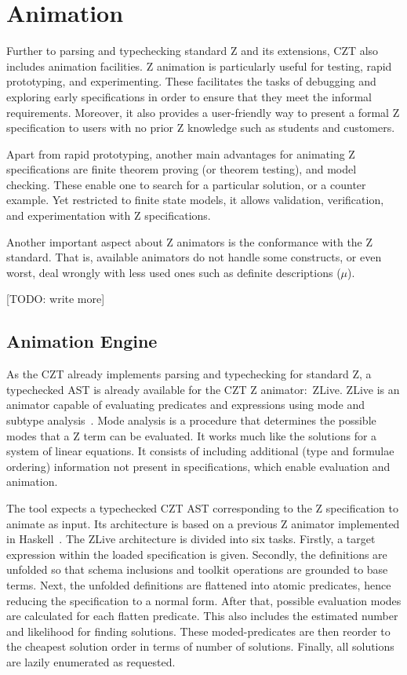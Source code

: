 \documentclass{llncs}
\begin{document}
\section{Animation}
\label{animation}

    Further to parsing and typechecking standard Z and its extensions, CZT also includes
    animation facilities. Z animation is particularly useful for testing, rapid prototyping,
    and experimenting. These facilitates the tasks of debugging and exploring early
    specifications in order to ensure that they meet the informal requirements.
    Moreover, it also provides a user-friendly way to present a formal Z specification
    to users with no prior Z knowledge such as students and customers.

    Apart from rapid prototyping, another main advantages for animating Z specifications
    are finite theorem proving (or theorem testing), and model checking.
    These enable one to search for a particular solution, or a counter example.
    Yet restricted to finite state models, it allows validation, verification, and
    experimentation with Z specifications.

    Another important aspect about Z animators is the conformance with the Z standard.
    That is, available animators do not handle some constructs, or even worst, deal
    wrongly with less used ones such as definite descriptions ($\mu$).

    [TODO: write more]

\subsection{Animation Engine}

    As the CZT already implements parsing and typechecking for standard Z,
    a typechecked AST is already available for the CZT Z animator:~ZLive.
    ZLive is an animator capable of evaluating predicates and expressions using
    mode and subtype analysis~\cite{winikooff98}.
    Mode analysis is a procedure that determines the possible modes that a
    Z term can be evaluated. It works much like the solutions for a system of linear equations.
    It consists of including additional (type and formulae ordering) information not
    present in specifications, which enable evaluation and animation.

    The tool expects a typechecked CZT AST corresponding to the Z specification to animate
    as input. Its architecture is based on a previous Z animator implemented in Haskell~\cite{utting-jaza}.
    The ZLive architecture is divided into six tasks.
    Firstly, a target expression within the loaded specification is given.
    Secondly, the definitions are unfolded so that schema inclusions and toolkit operations
    are grounded to base terms. Next, the unfolded definitions are flattened into atomic
    predicates, hence reducing the specification to a normal form.
    After that, possible evaluation modes are calculated for each flatten predicate.
    This also includes the estimated number and likelihood for finding solutions.
    These moded-predicates are then reorder to the cheapest solution order in terms of
    number of solutions. Finally, all solutions are lazily enumerated as requested.
\end{document}
